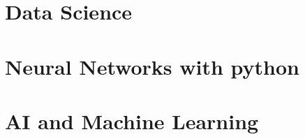\documentclass[a4paper,12pt]{book}
\begin{document}
\chapter{Data Science}

\chapter{Neural Networks with python}

\chapter{AI and Machine Learning}
\end{document}
